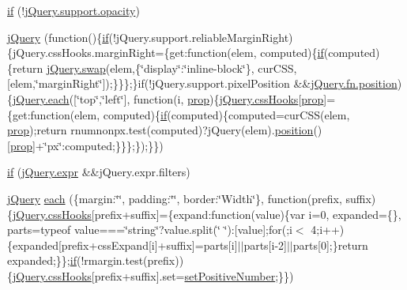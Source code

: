 \begin{DoxyCompactItemize}
\item 
\hyperlink{jquery-1_810_82_8js_abc7375d3165b805c35ce8ca2e1a31e81}{if} (!\hyperlink{jquery-1_810_82_8min_8js_a328c19d9255bfd09a2f3cddecadca6ad}{j\-Query.\-support.\-opacity})
\item 
\hyperlink{jquery-1_810_82_8js_a5e01048fbd3a30b44e8d491d8945c457}{j\-Query} (function()\{\hyperlink{jquery-1_810_82_8js_aa2cebb51f03a2e3ab2af45a3f9241c96}{if}(!j\-Query.\-support.\-reliable\-Margin\-Right)\{j\-Query.\-css\-Hooks.\-margin\-Right=\{get\-:function(elem, computed)\{\hyperlink{jquery-1_810_82_8js_aa2cebb51f03a2e3ab2af45a3f9241c96}{if}(computed)\{return \hyperlink{jquery-1_810_82-vsdoc_8js_a5e5b5f48f4ead1c526f9a8aede2780ef}{j\-Query.\-swap}(elem,\{\char`\"{}display\char`\"{}\-:\char`\"{}inline-\/block\char`\"{}\}, cur\-C\-S\-S, \mbox{[}elem,\char`\"{}margin\-Right\char`\"{}\mbox{]});\}\}\};\}if(!j\-Query.\-support.\-pixel\-Position \&\&\hyperlink{jquery-1_810_82-vsdoc_8js_a0a2a38b3281bb5c9cf0c479a04b513cb}{j\-Query.\-fn.\-position})\{\hyperlink{jquery-1_810_82_8min_8js_af24c9ea1e34372f8c8b312b35586008d}{j\-Query.\-each}(\mbox{[}\char`\"{}top\char`\"{},\char`\"{}left\char`\"{}\mbox{]}, function(i, \hyperlink{jquery-1_810_82-vsdoc_8js_af17be84954030af6c2286f5da385d41b}{prop})\{\hyperlink{jquery-1_810_82-vsdoc_8js_a9966a63bdc4e33753dbe36a83e7f96bf}{j\-Query.\-css\-Hooks}\mbox{[}\hyperlink{jquery-1_810_82-vsdoc_8js_af17be84954030af6c2286f5da385d41b}{prop}\mbox{]}=\{get\-:function(elem, computed)\{\hyperlink{jquery-1_810_82_8js_aa2cebb51f03a2e3ab2af45a3f9241c96}{if}(computed)\{computed=cur\-C\-S\-S(elem, \hyperlink{jquery-1_810_82-vsdoc_8js_af17be84954030af6c2286f5da385d41b}{prop});return rnumnonpx.\-test(computed)?j\-Query(elem).\hyperlink{jquery-1_810_82-vsdoc_8js_a0a2a38b3281bb5c9cf0c479a04b513cb}{position}()\mbox{[}\hyperlink{jquery-1_810_82-vsdoc_8js_af17be84954030af6c2286f5da385d41b}{prop}\mbox{]}+\char`\"{}px\char`\"{}\-:computed;\}\}\};\});\}\})
\item 
\hyperlink{jquery-1_810_82_8js_a0335a19470806a284d8c38df8f5b5718}{if} (\hyperlink{jquery-1_810_82-vsdoc_8js_aaacd1d5b3593ba4dfff6d67d4f6cfda1}{j\-Query.\-expr} \&\&j\-Query.\-expr.\-filters)
\item 
\hyperlink{jquery-1_810_82_8js_a5e01048fbd3a30b44e8d491d8945c457}{j\-Query} \hyperlink{jquery-1_810_82_8js_a4d613a6d16c025ab901ff536b58f9ecd}{each} (\{margin\-:\char`\"{}\char`\"{}, padding\-:\char`\"{}\char`\"{}, border\-:\char`\"{}Width\char`\"{}\}, function(prefix, suffix)\{\hyperlink{jquery-1_810_82-vsdoc_8js_a9966a63bdc4e33753dbe36a83e7f96bf}{j\-Query.\-css\-Hooks}\mbox{[}prefix+suffix\mbox{]}=\{expand\-:function(value)\{var i=0, expanded=\{\}, parts=typeof value===\char`\"{}string\char`\"{}?value.\-split(\char`\"{} \char`\"{})\-:\mbox{[}value\mbox{]};for(;i$<$ 4;i++)\{expanded\mbox{[}prefix+css\-Expand\mbox{[}i\mbox{]}+suffix\mbox{]}=parts\mbox{[}i\mbox{]}$\vert$$\vert$parts\mbox{[}i-\/2\mbox{]}$\vert$$\vert$parts\mbox{[}0\mbox{]};\}return expanded;\}\};\hyperlink{jquery-1_810_82_8js_aa2cebb51f03a2e3ab2af45a3f9241c96}{if}(!rmargin.\-test(prefix))\{\hyperlink{jquery-1_810_82-vsdoc_8js_a9966a63bdc4e33753dbe36a83e7f96bf}{j\-Query.\-css\-Hooks}\mbox{[}prefix+suffix\mbox{]}.set=\hyperlink{jquery-1_810_82_8js_a049182834e8b4b2d7485cd919ed272d7}{set\-Positive\-Number};\}\})

\end{DoxyCompactItemize}
